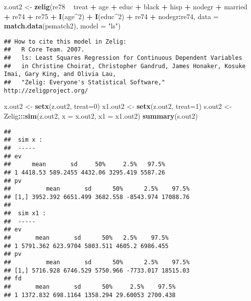 \documentclass[]{article}
\newenvironment{Shaded}{\begin{snugshade}}{\end{snugshade}}
\newcommand{\DataTypeTok}[1]{\textcolor[rgb]{0.13,0.29,0.53}{#1}}
\newcommand{\DecValTok}[1]{\textcolor[rgb]{0.00,0.00,0.81}{#1}}
\newcommand{\KeywordTok}[1]{\textcolor[rgb]{0.13,0.29,0.53}{\textbf{#1}}}
\newcommand{\NormalTok}[1]{#1}
\newcommand{\OperatorTok}[1]{\textcolor[rgb]{0.81,0.36,0.00}{\textbf{#1}}}
\newcommand{\StringTok}[1]{\textcolor[rgb]{0.31,0.60,0.02}{#1}}
\begin{document}
\begin{Shaded}
\begin{Highlighting}[]
\NormalTok{z.out2 <-}\StringTok{ }\KeywordTok{zelig}\NormalTok{(re78 }\OperatorTok{~}\StringTok{ }\NormalTok{treat }\OperatorTok{+}\StringTok{ }\NormalTok{age }\OperatorTok{+}\StringTok{ }\NormalTok{educ }\OperatorTok{+}\StringTok{ }\NormalTok{black }\OperatorTok{+}\StringTok{ }\NormalTok{hisp }\OperatorTok{+}\StringTok{ }\NormalTok{nodegr }\OperatorTok{+}\StringTok{ }\NormalTok{married }\OperatorTok{+}\StringTok{ }\NormalTok{re74 }\OperatorTok{+}\StringTok{ }\NormalTok{re75 }\OperatorTok{+}\StringTok{ }
\StringTok{                  }\KeywordTok{I}\NormalTok{(age}\OperatorTok{^}\DecValTok{2}\NormalTok{) }\OperatorTok{+}\StringTok{ }\KeywordTok{I}\NormalTok{(educ}\OperatorTok{^}\DecValTok{2}\NormalTok{) }\OperatorTok{+}\StringTok{ }\NormalTok{re74 }\OperatorTok{+}\StringTok{ }\NormalTok{nodegr}\OperatorTok{:}\NormalTok{re74, }\DataTypeTok{data =} \KeywordTok{match.data}\NormalTok{(psmatch2), }\DataTypeTok{model =} \StringTok{"ls"}\NormalTok{)}
\end{Highlighting}
\end{Shaded}

\begin{verbatim}
## How to cite this model in Zelig:
##   R Core Team. 2007.
##   ls: Least Squares Regression for Continuous Dependent Variables
##   in Christine Choirat, Christopher Gandrud, James Honaker, Kosuke Imai, Gary King, and Olivia Lau,
##   "Zelig: Everyone's Statistical Software," http://zeligproject.org/
\end{verbatim}

\begin{Shaded}
\begin{Highlighting}[]
\NormalTok{x.out2 <-}\StringTok{ }\KeywordTok{setx}\NormalTok{(z.out2, }\DataTypeTok{treat=}\DecValTok{0}\NormalTok{)}
\NormalTok{x1.out2 <-}\StringTok{ }\KeywordTok{setx}\NormalTok{(z.out2, }\DataTypeTok{treat=}\DecValTok{1}\NormalTok{)}
\NormalTok{s.out2 <-}\StringTok{ }\NormalTok{Zelig}\OperatorTok{:::}\KeywordTok{sim}\NormalTok{(z.out2, }\DataTypeTok{x =}\NormalTok{ x.out2, }\DataTypeTok{x1 =}\NormalTok{ x1.out2)}
\KeywordTok{summary}\NormalTok{(s.out2)}
\end{Highlighting}
\end{Shaded}

\begin{verbatim}
## 
##  sim x :
##  -----
## ev
##      mean       sd     50%     2.5%   97.5%
## 1 4418.53 589.2455 4432.06 3295.419 5587.26
## pv
##          mean       sd      50%      2.5%    97.5%
## [1,] 3952.392 6651.499 3682.558 -8543.974 17088.76
## 
##  sim x1 :
##  -----
## ev
##       mean       sd      50%   2.5%    97.5%
## 1 5791.362 623.9704 5803.511 4605.2 6986.455
## pv
##          mean       sd      50%      2.5%    97.5%
## [1,] 5716.928 6746.529 5750.966 -7733.017 18515.03
## fd
##       mean       sd      50%     2.5%    97.5%
## 1 1372.832 698.1164 1358.294 29.60053 2700.438
\end{verbatim}
\end{document}
